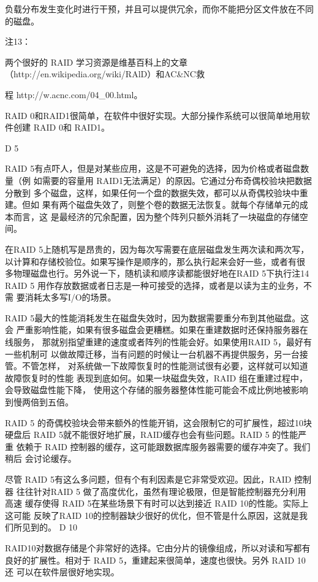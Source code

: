 负载分布发生变化时进行干预，并且可以提供冗余，而你不能把分区文件放在不同的磁盘。

注13：

两个很好的 RAID 学习资源是维基百科上的文章 （http://en.wikipedia.org/wiki/RAlD）和AC&NC救

程 http://w.acnc.com/04\_00.html。

RAID 0和RAID1很简单，在软件中很好实现。大部分操作系统可以很简单地用软
件创建 RAID 0和 RAID1。

D 5

RAID 5有点吓人，但是对某些应用，这是不可避免的选择，因为价格或者磁盘数量（例
如需要的容量用 RAID1无法满足）的原因。它通过分布奇偶校验块把数据分散到
多个磁盘，这样，如果任何一个盘的数据失效，都可以从奇偶校验块中重建。但如
果有两个磁盘失效了，则整个卷的数据无法恢复。就每个存储单元的成本而言，这
是最经济的冗余配置，因为整个阵列只额外消耗了一块磁盘的存储空间。

在RAID 5上随机写是昂贵的，因为每次写需要在底层磁盘发生两次读和两次写，
以计算和存储校验位。如果写操作是顺序的，那么执行起来会好一些，或者有很
多物理磁盘也行。另外说一下，随机读和顺序读都能很好地在RAID 5下执行注14
RAID 5 用作存放数据或者日志是一种可接受的选择，或者是以读为主的业务，不需
要消耗太多写I/O的场景。

RAID 5最大的性能消耗发生在磁盘失效时，因为数据需要重分布到其他磁盘。这会
严重影响性能，如果有很多磁盘会更糟糕。如果在重建数据时还保持服务器在线服务，
那就别指望重建的速度或者阵列的性能会好。如果使用RAID 5，最好有一些机制可
以做故障迁移，当有问题的时候让一台机器不再提供服务，另一台接管。不管怎样，
对系统做一下故障恢复时的性能测试很有必要，这样就可以知道故障恢复时的性能
表现到底如何。如果一块磁盘失效，RAID 组在重建过程中，会导致磁盘性能下降，
使用这个存储的服务器整体性能可能会不成比例地被影响到慢两倍到五倍。

RAID 5 的奇偶校验块会带来额外的性能开销，这会限制它的可扩展性，超过10块
硬盘后 RAID 5就不能很好地扩展，RAID缓存也会有些问题。RAID 5 的性能严重
依赖于 RAID 控制器的缓存，这可能跟数据库服务器需要的缓存冲突了。我们稍后
会讨论缓存。

尽管 RAID 5有这么多问题，但有个有利因素是它非常受欢迎。因此，RAID 控制器
往往针对RAID 5 做了高度优化，虽然有理论极限，但是智能控制器充分利用高速
缓存使得 RAID 5在某些场景下有时可以达到接近 RAID 10的性能。实际上这可能
反映了RAID 10的控制器缺少很好的优化，但不管是什么原因，这就是我们所见到的。
D 10

RAID10对数据存储是个非常好的选择。它由分片的镜像组成，所以对读和写都有
良好的扩展性。相对于 RAID 5，重建起来很简单，速度也很快。另外 RAID 10还
可以在软件层很好地实现。

